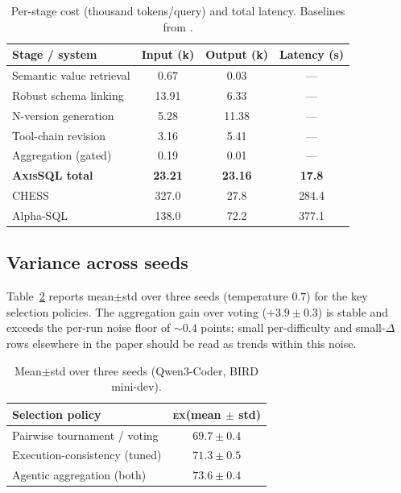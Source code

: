 \documentclass{article}
\newcommand{\sys}{\textsc{AxisSQL}\xspace}
\newcommand{\ex}{\textsc{ex}\xspace}
\begin{document}
\begin{table}[h]
\centering\small
\caption{Per-stage cost (thousand tokens/query) and total latency. Baselines from \citet{li2026deepeye,li2025alphasql,talaei2024chess}.}
\label{tab:s-cost}
\begin{tabular}{@{}lccc@{}}
\toprule
\textbf{Stage / system} & \textbf{Input (k)} & \textbf{Output (k)} & \textbf{Latency (s)} \\
\midrule
Semantic value retrieval & 0.67 & 0.03 & --- \\
Robust schema linking    & 13.91 & 6.33 & --- \\
N-version generation     & 5.28 & 11.38 & --- \\
Tool-chain revision      & 3.16 & 5.41 & --- \\
Aggregation (gated)      & 0.19 & 0.01 & --- \\
\textbf{\sys{} total}    & \textbf{23.21} & \textbf{23.16} & \textbf{17.8} \\
\midrule
CHESS \citep{talaei2024chess}      & 327.0 & 27.8 & 284.4 \\
Alpha-SQL \citep{li2025alphasql}   & 138.0 & 72.2 & 377.1 \\
\bottomrule
\end{tabular}
\end{table}

\subsection{Variance across seeds}
\label{app:var}
Table~\ref{tab:s-var} reports mean$\pm$std over three seeds (temperature $0.7$) for the key selection policies. The aggregation gain over voting ($+3.9\pm0.3$) is stable and exceeds the per-run noise floor of $\sim\!0.4$ points; small per-difficulty and small-$\Delta$ rows elsewhere in the paper should be read as trends within this noise.

\begin{table}[h]
\centering\small
\caption{Mean$\pm$std over three seeds (Qwen3-Coder, BIRD mini-dev).}
\label{tab:s-var}
\begin{tabular}{@{}lc@{}}
\toprule
\textbf{Selection policy} & \textbf{\ex (mean $\pm$ std)} \\
\midrule
Pairwise tournament / voting & $69.7 \pm 0.4$ \\
Execution-consistency (tuned) & $71.3 \pm 0.5$ \\
Agentic aggregation (both)    & $\mathbf{73.6 \pm 0.4}$ \\
\bottomrule
\end{tabular}
\end{table}
\end{document}
